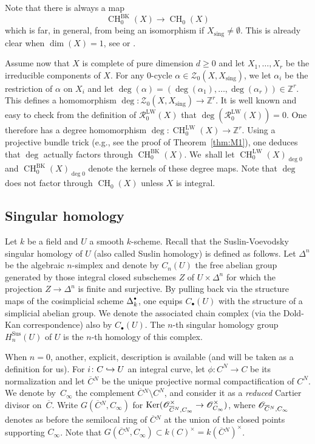 \documentclass[11pt]{article}
\numberwithin{equation}{section}
\let\mathcal\mathscr
\def\hto{\mathrel{\lhook\joinrel\to}}
\let\inj\hto
\newcommand{\sbullet}{{\scriptscriptstyle\bullet}}
\newcommand{\csbullet}{{\raisebox{1pt}{$\sbullet$}}}
\newcommand{\BK}{\mathrm{BK}}
\newcommand{\LW}{\mathrm{LW}}
\newcommand{\sus}{\mathrm{Sus}}
\theoremstyle{definition}
\newcommand{\thmref}{Theorem~\ref}
\newcommand{\sR}{{\mathcal R}}
\newcommand{\sZ}{{\mathcal Z}}
\newcommand{\Z}{{\mathbb Z}}
\DeclareMathOperator{\CH}{CH}
\DeclareMathOperator{\Ker}{Ker}
\newcommand{\sing}{\mathrm{sing}}
\let\ov\overline
\let\ol\ov
\begin{document}
Note that there is always a map
\begin{equation}\label{eqn:lci-Fulton}
\CH^{\BK}_0(X) \to \CH_0(X)
\end{equation}
which is far, in general, from being an isomorphism if $X_{\sing} \neq
\emptyset$. This is already clear when $\dim (X)=1$, see \cite{LW} or
\cite[Lem.\,3.12]{BK}.

Assume now that $X$ is complete of pure dimension $d \ge 0$ and let
$X_1, \ldots, X_r$ be the irreducible components of $X$. For any
$0$-cycle $\alpha \in \sZ_0(X, X_\sing)$, we let
$\alpha_i$ be the restriction of $\alpha$ on $X_i$ and let
$\deg(\alpha) = (\deg(\alpha_1), \ldots , \deg(\alpha_r)) \in \Z^r$.
This defines a homomorphism
$\deg \colon \sZ_0(X, X_\sing) \to \Z^r$. It is well known and easy to check
from the definition of $\sR^{\LW}_0(X)$ that $\deg(\sR^{\LW}_0(X)) = 0$.
One therefore has a degree homomorphism
$\deg \colon \CH^{\LW}_0(X) \to \Z^r$. Using a projective bundle trick (e.g., see
the proof of \thmref{thm:M1}), one deduces that $\deg$ actually factors
through $\CH^{\BK}_0(X)$. We~shall let $\CH^{\LW}_0(X)_{\deg 0}$ and
$\CH^{\BK}_0(X)_{\deg 0}$ denote the kernels of these degree maps.
Note that $\deg$ does not factor through $\CH_0(X)$ unless $X$ is integral.

\subsection{Singular homology}\label{ssec:SuslinHomologydef}
Let $k$ be a field and $U$ a smooth $k$-scheme. Recall that the Suslin-Voevodsky singular homology of $U$ (also called Suslin homology) is defined as follows. Let $\Delta^n$ be the algebraic $n$-simplex and denote by $C_n(U)$ the free abelian group generated by those integral closed subschemes $Z$ of $U\times \Delta^n$ for which the projection $Z\to \Delta^n$ is finite and surjective. By pulling back via the structure maps of the cosimplicial scheme $\Delta^{\csbullet}_k$, one equips $C_\sbullet(U)$ with the structure of a simplicial abelian group. We denote the associated chain complex (via the Dold-Kan correspondence) also by $C_\sbullet(U)$. The $n$-th singular homology
group $H^{\sus}_n(U)$ of $U$ is the $n$-th homology of this complex.

When $n=0$, another, explicit, description is available (and will be taken as a definition for us). For $i\colon C\inj U$ an integral curve, let $\phi\colon C^N\to C$ be its normalization and let $\ol{C}{}^N$ be the unique projective normal
compactification of $C^N$. We denote by~$C_\infty$ the complement $\ol{C}{}^N \setminus C^N$, and consider it as a \emph{reduced} Cartier divisor on~$\ol{C}$. Write $G(\ol{C}{}^N, C_\infty)$ for $\Ker(\cO_{\ol{C}{}^N, C_\infty}^\times \to \cO_{C_\infty}^\times)$, where $\cO_{\ol{C}{}^N, C_\infty}$ denotes as before the semilocal ring of $\ol{C}{}^N$ at the union of the closed points supporting $C_\infty$. Note that $G(\ol{C}{}^N, C_\infty)\subset k(C)^\times = k(\ol{C}{}^N)^\times$.
\end{document}
